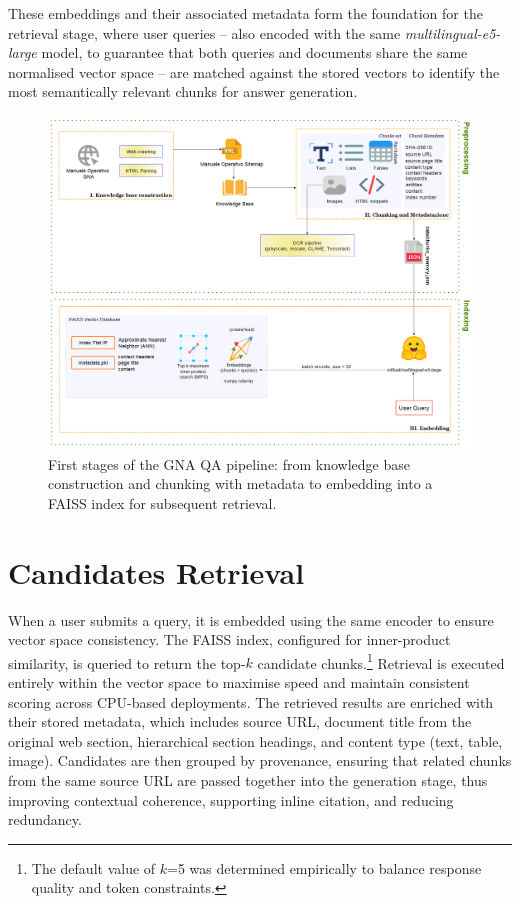 \begin{spacing}{1.5}
These embeddings and their associated metadata form the foundation for the retrieval stage, where user queries -- also encoded with the same \textit{multilingual-e5-large} model, to guarantee that both queries and documents share the same normalised vector space -- are matched against the stored vectors to identify the most semantically relevant chunks for answer generation.

\begin{figure}[H]
  \centering
  \includegraphics[width=\textwidth]{images/preprocess_diagram.png} 
  \caption{First stages of the GNA QA pipeline: from knowledge base construction and chunking with metadata to embedding into a FAISS index for subsequent retrieval.}
  \label{fig:pre}
\end{figure}

\section{Candidates Retrieval}
When a user submits a query, it is embedded using the same encoder to ensure vector space consistency. The FAISS index, configured for inner-product similarity, is queried to return the top-$k$ candidate chunks.\footnote{The default value of $k$=5 was determined empirically to balance response quality and token constraints.} Retrieval is executed entirely within the vector space to maximise speed and maintain consistent scoring across CPU-based deployments. The retrieved results are enriched with their stored metadata, which includes source URL, document title from the original web section, hierarchical section headings, and content type (text, table, image). Candidates are then grouped by provenance, ensuring that related chunks from the same source URL are passed together into the generation stage, thus improving contextual coherence, supporting inline citation, and reducing redundancy.


\end{spacing}
